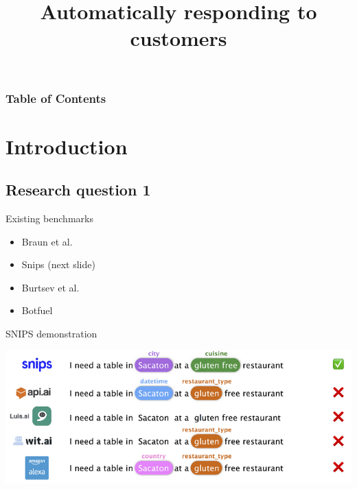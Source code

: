 \documentclass[pdf]{beamer}
\title{Automatically responding to customers}
\begin{document}
\begin{frame}
  \titlepage
\end{frame}

\begin{frame}
  \frametitle{Table of Contents}
  \tableofcontents[hideothersubsections]
\end{frame}

\section{Introduction}
\subsection{Research question 1}
\begin{frame}{Existing benchmarks}
  \begin{itemize}
  \item Braun et al.
  \item Snips (next slide)
  \item Burtsev et al.
  \item Botfuel
  \end{itemize}
\end{frame}

\begin{frame}{SNIPS demonstration}
  \begin{center}
\includegraphics[width=\textwidth]{figures/snips_ner.png}
  \end{center}
\end{frame}
\end{document}
